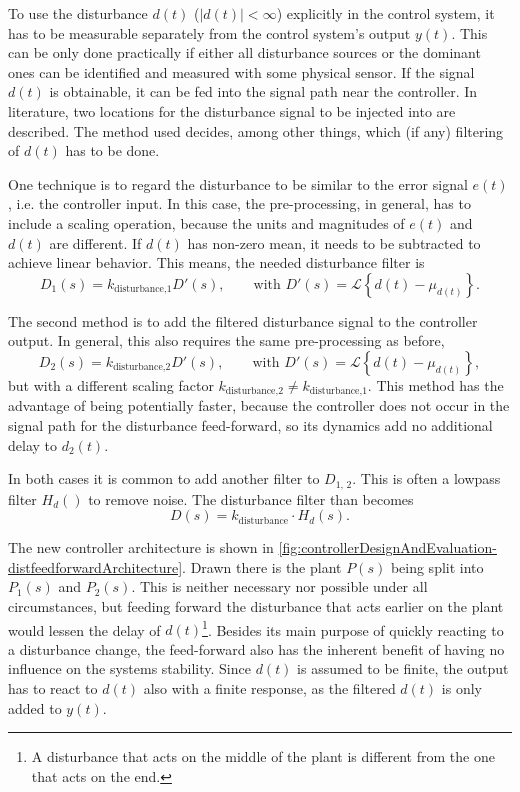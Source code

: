 To use the disturbance $d(t)$ ($|d(t)|<\infty$) explicitly in the control system, it has to be measurable separately from the control system's output $y(t)$. This can be only done practically if either all disturbance sources or the dominant ones can be identified and measured with some physical sensor. If the signal $d(t)$ is obtainable, it can be fed into the signal path near the controller. In literature, two locations for the disturbance signal to be injected into are described. The method used decides, among other things, which (if any) filtering of $d(t)$ has to be done.

One technique is to regard the disturbance to be similar to the error signal $e(t)$, i.e. the controller input. \cite{Brosilow2002} In this case, the pre-processing, in general, has to include a scaling operation, because the units and magnitudes of $e(t)$ and $d(t)$ are different. If $d(t)$ has non-zero mean, it needs to be subtracted to achieve linear behavior. This means, the needed disturbance filter is
\begin{equation}
D_1(s)=k_\text{disturbance,1} D'(s),\qquad \text{with } D'(s)=\mathcal{L}\left\{d(t)-\mu_{d(t)}\right\}.
\end{equation}

The second method is to add the filtered disturbance signal to the controller output. \cite{Foellinger2016,electronics7100223} In general, this also requires the same pre-processing as before,
\begin{equation}
D_2(s)=k_\text{disturbance,2} D'(s),\qquad \text{with } D'(s)=\mathcal{L}\left\{d(t)-\mu_{d(t)}\right\},
\end{equation}
but with a different scaling factor $k_\text{disturbance,2} \neq k_\text{disturbance,1}$. This method has the advantage of being potentially faster, because the controller does not occur in the signal path for the disturbance feed-forward, so its dynamics add no additional delay to $d_2(t)$.

In both cases it is common to add another filter to $D_{1,\,2}$. This is often a lowpass filter $H_d()$ to remove noise. The disturbance filter than becomes
\begin{equation}
D(s) = k_\text{disturbance} \cdot H_d(s).
\end{equation}

The new controller architecture is shown in \autoref{fig:controllerDesignAndEvaluation-distfeedforwardArchitecture}. Drawn there is the plant $P(s)$ being split into $P_1(s)$ and $P_2(s)$. This is neither necessary nor possible under all circumstances, but feeding forward the disturbance that acts earlier on the plant would lessen the delay of $d(t)$\footnote{A disturbance that acts on the middle of the plant is different from the one that acts on the end.}. Besides its main purpose of quickly reacting to a disturbance change, the feed-forward also has the inherent benefit of having no influence on the systems stability. Since $d(t)$ is assumed to be finite, the output has to react to $d(t)$ also with a finite response, as the filtered $d(t)$ is only added to $y(t)$.

